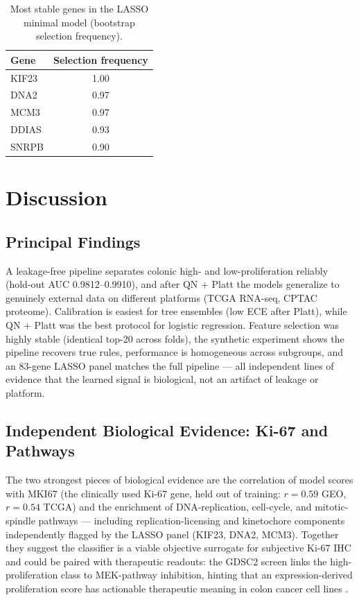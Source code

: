 \documentclass[12pt]{article}
\begin{document}
\begin{table}[htbp]
\centering
\caption{Most stable genes in the LASSO minimal model (bootstrap selection frequency).}
\label{tab:lassostab}
\begin{tabular}{lc}
\toprule
\textbf{Gene} & \textbf{Selection frequency} \\
\midrule
KIF23 & 1.00 \\
DNA2 & 0.97 \\
MCM3 & 0.97 \\
DDIAS & 0.93 \\
SNRPB & 0.90 \\
\bottomrule
\end{tabular}
\end{table}

\section{Discussion}

\subsection{Principal Findings}
A leakage-free pipeline separates colonic high- and low-proliferation reliably (hold-out AUC 0.9812--0.9910), and after QN + Platt the models generalize to genuinely external data on different platforms (TCGA RNA-seq, CPTAC proteome). Calibration is easiest for tree ensembles (low ECE after Platt), while QN + Platt was the best protocol for logistic regression. Feature selection was highly stable (identical top-20 across folds), the synthetic experiment shows the pipeline recovers true rules, performance is homogeneous across subgroups, and an 83-gene LASSO panel matches the full pipeline --- all independent lines of evidence that the learned signal is biological, not an artifact of leakage or platform.

\subsection{Independent Biological Evidence: Ki-67 and Pathways}
The two strongest pieces of biological evidence are the correlation of model scores with MKI67 (the clinically used Ki-67 gene, held out of training: $r = 0.59$ GEO, $r = 0.54$ TCGA) and the enrichment of DNA-replication, cell-cycle, and mitotic-spindle pathways --- including replication-licensing and kinetochore components independently flagged by the LASSO panel (KIF23, DNA2, MCM3). Together they suggest the classifier is a viable objective surrogate for subjective Ki-67 IHC \citep{zeng2025} and could be paired with therapeutic readouts: the GDSC2 screen links the high-proliferation class to MEK-pathway inhibition, hinting that an expression-derived proliferation score has actionable therapeutic meaning in colon cancer cell lines \citep{iorio2016}.
\end{document}
